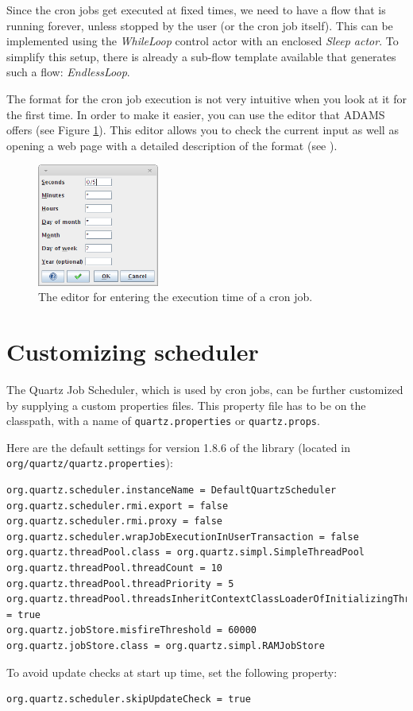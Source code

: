 \documentclass[a4paper]{book}
\begin{document}
Since the cron jobs get executed at fixed times, we need to have a flow that is
running forever, unless stopped by the user (or the cron job itself). This can 
be implemented using the \textit{WhileLoop} control actor with an enclosed 
\textit{Sleep actor}. To simplify this setup, there is already a sub-flow 
template available that generates such a flow: \textit{EndlessLoop}.

The format for the cron job execution is not very intuitive when you look at it
for the first time. In order to make it easier, you can use the editor that ADAMS
offers (see Figure \ref{cron-editor}). This editor allows you to check the
current input as well as opening a web page with a detailed description of
the format (see \cite{cronformat}).

\begin{figure}[htb]
  \centering
  \includegraphics[width=4.0cm]{images/cron-editor.png}
  \caption{The editor for entering the execution time of a cron job.}
  \label{cron-editor}
\end{figure}

\section{Customizing scheduler}
The Quartz Job Scheduler\cite{quartz}, which is used by cron jobs, can be further
customized by supplying a custom properties files. This property file has to be
on the classpath, with a name of \texttt{quartz.properties} or \texttt{quartz.props}.

Here are the default settings for version 1.8.6 of the library (located in
\texttt{org/quartz/quartz.properties}):
\begin{verbatim}
org.quartz.scheduler.instanceName = DefaultQuartzScheduler
org.quartz.scheduler.rmi.export = false
org.quartz.scheduler.rmi.proxy = false
org.quartz.scheduler.wrapJobExecutionInUserTransaction = false
org.quartz.threadPool.class = org.quartz.simpl.SimpleThreadPool
org.quartz.threadPool.threadCount = 10
org.quartz.threadPool.threadPriority = 5
org.quartz.threadPool.threadsInheritContextClassLoaderOfInitializingThread = true
org.quartz.jobStore.misfireThreshold = 60000
org.quartz.jobStore.class = org.quartz.simpl.RAMJobStore
\end{verbatim}
To avoid update checks at start up time, set the following property:
\begin{verbatim}
org.quartz.scheduler.skipUpdateCheck = true
\end{verbatim}


\end{document}
